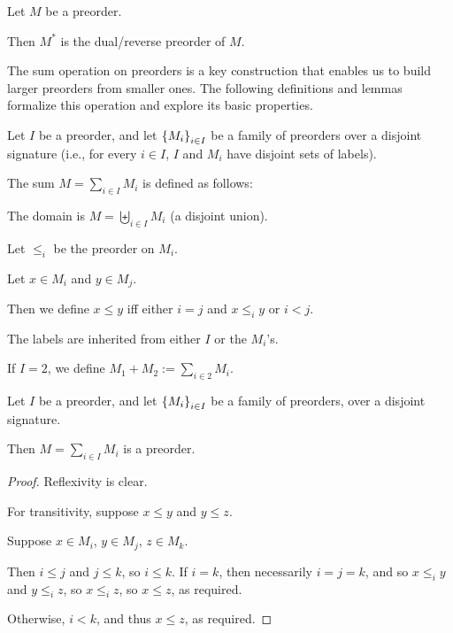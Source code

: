 \begin{definition}
  Let $M$ be a preorder.

  Then $M^\ast$ is the dual/reverse preorder of $M$.
\end{definition}

The sum operation on preorders is a key construction that enables us to build larger preorders from smaller ones. The following
definitions and lemmas formalize this operation and explore its basic properties.

\begin{definition}
  Let $I$ be a preorder, and let $\left\{ {M_i} \right\}_{i \in I}$ be a family of preorders over
  a disjoint signature (i.e., for every $i \in I$, $I$ and $M_i$ have disjoint sets of labels).

  The sum $M = \sum_{i \in I} M_i$ is defined as follows:

  The domain is $M = \biguplus_{i \in I} M_i$ (a disjoint union).

  Let $\le_i$ be the preorder on $M_i$.

  Let $x \in M_i$ and $y \in M_j$.

  Then we define $x \le y$ iff either
  $i = j$ and $x \le_i y$ or $i < j$.

  The labels are inherited from either $I$ or the $M_i$'s.

  If $I = 2$, we define $M_1 + M_2 := \sum_{i \in 2} M_i$.
\end{definition}

\begin{lemma}
  Let $I$ be a preorder, and let $\left\{ {M_i} \right\}_{i \in I}$ be a family of preorders,
  over a disjoint signature.

  Then $M = \sum_{i \in I} M_i$ is a preorder.
\end{lemma}

\begin{proof}
  Reflexivity is clear.

  For transitivity, suppose $x \le y$ and $y \le z$.

  Suppose $x \in M_i$, $y \in M_j$, $z \in M_k$.

  Then $i \le j$ and $j \le k$, so $i \le k$.
  If $i = k$, then necessarily $i = j = k$, and so $x \le_i y$ and $y \le_i z$,
  so $x \le_i z$, so $x \le z$, as required.

  Otherwise, $i < k$, and thus $x \le z$, as required.
\end{proof}

